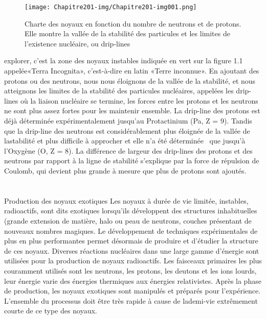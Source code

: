  
 
 
 \begin{figure}[htb]
 	\texttt{[image: Chapitre201-img/Chapitre201-img001.png]}
 	\caption{Charte des noyaux en
 		fonction du nombre de neutrons et de protons. Elle montre la vallée de la stabilité des particules et les
 		limites de l'existence nucléaire, ou {\textquotedbl}drip-lines{\textquotedbl}}
 \end{figure}
 
  

explorer, c'est la zone des noyaux instables indiquée en vert sur la figure 1.1 appelée«Terra Incognita»,
c'est-à-dire en latin «Terre inconnue». En ajoutant des protons ou des neutrons, nous nous éloignons de la vallée de la
stabilité, et nous atteignons les limites de la stabilité des particules nucléaires, appelées les
{\textquotedbl}drip-lines{\textquotedbl} où la liaison nucléaire se termine, les forces entre les protons et les
neutrons ne sont plus assez fortes pour les maintenir ensemble. La drip-line des protons est déjà déterminée
expérimentalement jusqu'au Protactinium (Pa, Z = 9). Tandis que la drip-line des neutrons est
considérablement plus éloignée de la vallée de lastabilité et plus difficile à approcher et elle n'a été déterminée
\ que jusqu'à l'Oxygène (O, Z = 8). La différence de largeur des drip-lines des protons et des neutrons par rapport à
la ligne de stabilité s'explique par la force de répulsion de Coulomb, qui devient plus grande à mesure que plus de
protons sont ajoutés.
\section{}{Production des noyaux exotiques}
 Les noyaux à durée de vie limitée, instables, radioactifs, sont dits exotiques lorsqu'ils
développent des structures inhabituelles (grande extension de matière, halo ou peau de neutrons, couches présentant de
nouveaux nombres magiques.  Le développement de techniques expérimentales de plus en plus performantes permet
désormais de produire et d'étudier la structure de ces noyaux.
 Diverses réactions nucléaires dans une large gamme d'énergie sont utilisées pour la production de noyaux
radioactifs. Les faisceaux primaires les plus couramment utilisés sont les neutrons, les protons, les deutons et les
ions lourds, leur énergie varie des énergies thermiques aux énergies relativistes. Après la phase de production, les
noyaux exotiques sont manipulés et préparés pour l'expérience. L'ensemble du processus doit être très rapide à cause de
lademi-vie extrêmement courte de ce type des noyaux.


